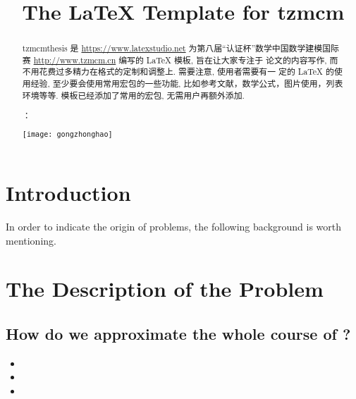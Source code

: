 \documentclass{tzmcmthesis}
\title{The \LaTeX{} Template for tzmcm} %
\begin{document}
\maketitle
\begin{abstract}
tzmcmthesis 是 \url{https://www.latexstudio.net} 为第八届“认证杯”数学中国数学建模国际赛 \url{http://www.tzmcm.cn} 编写的 \LaTeX{} 模板, 旨在让大家专注于 论文的内容写作, 而不用花费过多精力在格式的定制和调整上.
需要注意, 使用者需要有一 定的 \LaTeX{} 的使用经验, 至少要会使用常用宏包的一些功能, 比如参考文献，数学公式，图片使用，列表环境等等.  模板已经添加了常用的宏包, 无需用户再额外添加.

：

\centerline{\texttt{[image: gongzhonghao]}}

\end{abstract}



\newpage
\tableofcontents


\newpage

\section{Introduction}
In order to indicate the origin of       problems, the following background is worth mentioning.
\subsection{}


\subsection{}



\subsection{}


\section{The Description of the Problem}
\subsection{How do we approximate the whole course of ?}

\begin{itemize}
  \item
  \item
  \item
\end{itemize}
\end{document}
